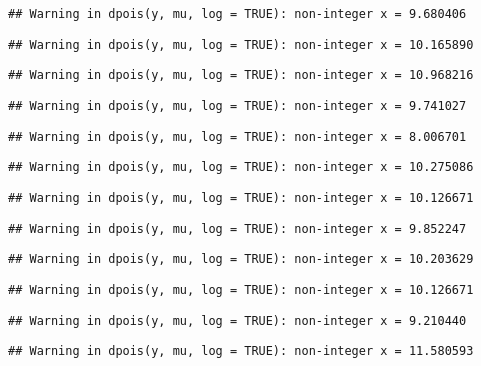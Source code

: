 \documentclass[
]{article}
\begin{document}
\begin{verbatim}
## Warning in dpois(y, mu, log = TRUE): non-integer x = 9.680406
\end{verbatim}

\begin{verbatim}
## Warning in dpois(y, mu, log = TRUE): non-integer x = 10.165890
\end{verbatim}

\begin{verbatim}
## Warning in dpois(y, mu, log = TRUE): non-integer x = 10.968216
\end{verbatim}

\begin{verbatim}
## Warning in dpois(y, mu, log = TRUE): non-integer x = 9.741027
\end{verbatim}

\begin{verbatim}
## Warning in dpois(y, mu, log = TRUE): non-integer x = 8.006701
\end{verbatim}

\begin{verbatim}
## Warning in dpois(y, mu, log = TRUE): non-integer x = 10.275086
\end{verbatim}

\begin{verbatim}
## Warning in dpois(y, mu, log = TRUE): non-integer x = 10.126671
\end{verbatim}

\begin{verbatim}
## Warning in dpois(y, mu, log = TRUE): non-integer x = 9.852247
\end{verbatim}

\begin{verbatim}
## Warning in dpois(y, mu, log = TRUE): non-integer x = 10.203629
\end{verbatim}

\begin{verbatim}
## Warning in dpois(y, mu, log = TRUE): non-integer x = 10.126671
\end{verbatim}

\begin{verbatim}
## Warning in dpois(y, mu, log = TRUE): non-integer x = 9.210440
\end{verbatim}

\begin{verbatim}
## Warning in dpois(y, mu, log = TRUE): non-integer x = 11.580593
\end{verbatim}
\end{document}
